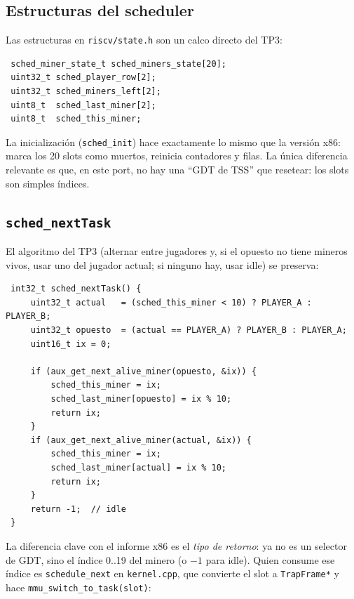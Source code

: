 \subsection{Estructuras del scheduler}

Las estructuras en \texttt{riscv/state.h} son un calco directo del TP3:

\begin{codesnippet}
\begin{verbatim}
 sched_miner_state_t sched_miners_state[20];
 uint32_t sched_player_row[2];
 uint32_t sched_miners_left[2];
 uint8_t  sched_last_miner[2];
 uint8_t  sched_this_miner;
\end{verbatim}
\end{codesnippet}

La inicialización (\texttt{sched\_init}) hace exactamente lo mismo que la versión x86: marca los 20 slots como muertos,
reinicia contadores y filas. La única diferencia relevante es que, en este port, no hay una ``GDT de TSS'' que resetear:
los slots son simples índices.

\subsection{\texttt{sched\_nextTask}}

El algoritmo del TP3 (alternar entre jugadores y, si el opuesto no tiene mineros vivos, usar uno del jugador actual; si
ninguno hay, usar idle) se preserva:

\begin{codesnippet}
\begin{verbatim}
 int32_t sched_nextTask() {
     uint32_t actual   = (sched_this_miner < 10) ? PLAYER_A : PLAYER_B;
     uint32_t opuesto  = (actual == PLAYER_A) ? PLAYER_B : PLAYER_A;
     uint16_t ix = 0;

     if (aux_get_next_alive_miner(opuesto, &ix)) {
         sched_this_miner = ix;
         sched_last_miner[opuesto] = ix % 10;
         return ix;
     }
     if (aux_get_next_alive_miner(actual, &ix)) {
         sched_this_miner = ix;
         sched_last_miner[actual] = ix % 10;
         return ix;
     }
     return -1;  // idle
 }
\end{verbatim}
\end{codesnippet}

La diferencia clave con el informe x86 es el \emph{tipo de retorno}: ya no es un selector de GDT, sino el índice 0..19
del minero (o $-1$ para idle). Quien consume ese índice es \texttt{schedule\_next} en \texttt{kernel.cpp}, que convierte
el slot a \texttt{TrapFrame*} y hace \texttt{mmu\_switch\_to\_task(slot)}:

